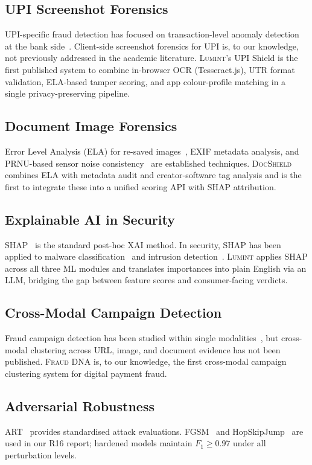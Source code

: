 \documentclass[conference]{IEEEtran}
\begin{document}
\subsection{UPI Screenshot Forensics}
UPI-specific fraud detection has focused on transaction-level anomaly
detection at the bank side~\cite{rbi2023framework}.
Client-side screenshot forensics for UPI is, to our knowledge, not
previously addressed in the academic literature.
\textsc{Lumint}'s UPI Shield is the first published system to combine
in-browser OCR (Tesseract.js), UTR format validation, ELA-based tamper
scoring, and app colour-profile matching in a single
privacy-preserving pipeline.

\subsection{Document Image Forensics}
Error Level Analysis (ELA) for re-saved images~\cite{krawetz2007},
EXIF metadata analysis, and PRNU-based sensor noise
consistency~\cite{fridrich2009} are established techniques.
\textsc{DocShield} combines ELA with metadata audit and creator-software
tag analysis and is the first to integrate these into a unified scoring
API with SHAP attribution.

\subsection{Explainable AI in Security}
SHAP~\cite{lundberg2017} is the standard post-hoc XAI method.
In security, SHAP has been applied to malware
classification~\cite{imboden2017} and intrusion
detection~\cite{burns2021}.
\textsc{Lumint} applies SHAP across all three ML modules and translates
importances into plain English via an LLM, bridging the gap between
feature scores and consumer-facing verdicts.

\subsection{Cross-Modal Campaign Detection}
Fraud campaign detection has been studied within single
modalities~\cite{le2009}, but cross-modal clustering across URL, image,
and document evidence has not been published.
\textsc{Fraud DNA} is, to our knowledge, the first cross-modal campaign
clustering system for digital payment fraud.

\subsection{Adversarial Robustness}
ART~\cite{nicolae2018} provides standardised attack evaluations.
FGSM~\cite{goodfellow2015} and HopSkipJump~\cite{chen2020} are used in
our R16 report; hardened models maintain $F_1{\geq}0.97$ under all
perturbation levels.
\end{document}
